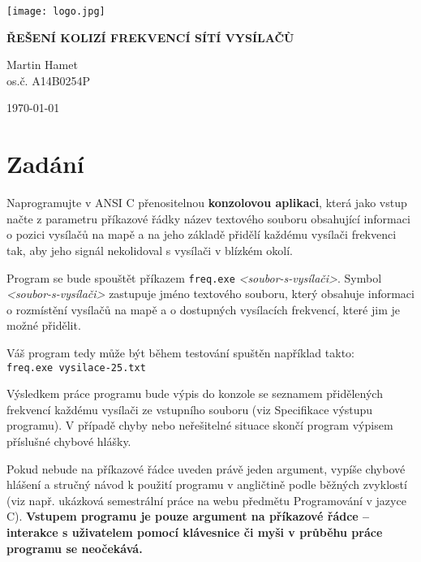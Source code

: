 \documentclass[12pt]{report}
\begin{document}
\setlength{\parindent}{0pt}
\begin{titlepage}
\texttt{[image: logo.jpg]}
\begin{center}
\vspace{5cm}
{\Large
\textbf{ŘEŠENÍ KOLIZÍ FREKVENCÍ SÍTÍ VYSÍLAČÙ}
}
\end{center}
\vspace{\fill}

\begin{minipage}[t]{5cm}
\flushleft
Martin Hamet\\
os.č. A14B0254P
\end{minipage}
\hfill
\begin{minipage}[t]{7cm}
\flushright
\today
\end{minipage}
\end{titlepage}

\tableofcontents

\chapter{Zadání}
\setlength{\parskip}{\baselineskip}
Naprogramujte v ANSI C přenositelnou \textbf{konzolovou aplikaci}, která jako vstup načte z parametru příkazové řádky název textového souboru obsahující informaci o pozici vysílačů na mapě a na jeho základě přidělí každému vysílači frekvenci tak, aby jeho signál nekolidoval s vysílači v blízkém okolí.


Program se bude spouštět příkazem \texttt{freq.exe} \textit{\textless soubor-s-vysílači\textgreater}. Symbol \textit{\textless soubor-s-vysílači\textgreater} zastupuje jméno textového souboru, který obsahuje informaci o rozmístění vysílačů na mapě a o dostupných vysílacích frekvencí, které jim je možné přidělit.


Váš program tedy může být během testování spuštěn například takto:\\
\texttt{freq.exe vysilace-25.txt}


Výsledkem práce programu bude výpis do konzole se seznamem přidělených frekvencí každému vysílači ze vstupního souboru (viz Specifikace výstupu programu). V případě chyby nebo neřešitelné situace skončí program výpisem příslušné chybové hlášky.


Pokud nebude na příkazové řádce uveden právě jeden argument, vypíše chybové hlášení a stručný návod k použití programu v angličtině podle běžných zvyklostí (viz např. ukázková semestrální práce na webu předmětu Programování v jazyce C). \textbf{Vstupem programu je pouze argument na příkazové řádce -- interakce s uživatelem pomocí klávesnice či myši v průběhu práce programu se neočekává.}
\end{document}
